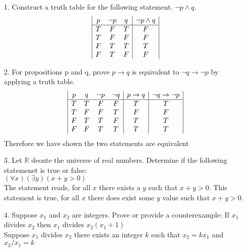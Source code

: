 \documentclass[a4paper,12pt]{article}
\begin{document}
    \begin{itemize}
      \item[1.] Construct a truth table for the following statement. $\lnot p \land q$.
      \begin{displaymath}
        \begin{array}{|c c c|c|}
        p &\lnot p & q  & \lnot p \land q\\
        \hline
        T & F & T & F\\
        T & F & F & F \\
        F & T & T & T\\
        F & T & F & F\\
        \end{array}
      \end{displaymath}  
      \item[2.] For propositions p and q, prove $p \rightarrow q$ is equivalent to $\lnot q \rightarrow \lnot p$ by applying a truth table. 
      \begin{displaymath}
        \begin{array}{|c c c c|c|c|}
        p  & q & \neg p & \neg q  & p \rightarrow q & \neg q \rightarrow \neg p\\
        \hline
        T & T & F & F & T & T\\
        T & F & F & T & F & F\\
        F & T & T & F & T & T \\
        F & F & T & T & T & T\\
        \end{array}
      \end{displaymath}   
      Therefore we have shown the two statements are equivalent
      \item[3.] Let $\mathbb{R}$ deonte the universe of real numbers. Determine if the following statemenet is true or false:
      \\
      $(\forall x)(\exists y)(x + y > 0)$
      \\ 
      The statement reads, for all $x$ there exists a $y$ such that $x+y > 0$. This statement is true, for all $x$ there does exist some $y$ value such that $x+ y>0$. 
      \item[4.] Suppose $x_1$ and $x_2$ are integers. Prove or provide a counterexample: If $x_1$ divides $x_2$ then $x_1$ divides $x_2(x_1+1)$
      \\
      Suppose $x_1$ divides $x_2$ there exists an integer $k$ such that $x_2 = kx_1$ and $x_2/x_1 = k$
      \\

\end{itemize}
\end{document}
